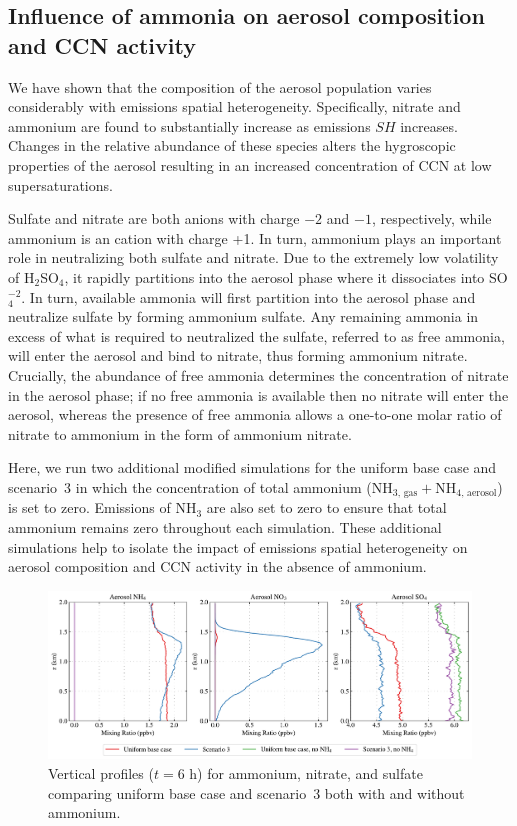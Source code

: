\subsection{Influence of ammonia on aerosol composition and CCN activity}

We have shown that the composition of the aerosol population varies considerably with emissions spatial heterogeneity. Specifically, nitrate and ammonium are found to substantially increase as emissions $SH$ increases. Changes in the relative abundance of these species alters the hygroscopic properties of the aerosol resulting in an increased concentration of CCN at low supersaturations. 

Sulfate and nitrate are both anions with charge $-2$ and $-1$, respectively, while ammonium is an cation with charge +1. In turn, ammonium plays an important role in neutralizing both sulfate and nitrate. Due to the extremely low volatility of H$_2$SO$_4$, it rapidly partitions into the aerosol phase where it dissociates into SO$_4^{-2}$. In turn, available ammonia will first partition into the aerosol phase and neutralize sulfate by forming ammonium sulfate. Any remaining ammonia in excess of what is required to neutralized the sulfate, referred to as free ammonia, will enter the aerosol and bind to nitrate, thus forming ammonium nitrate. Crucially, the abundance of free ammonia determines the concentration of nitrate in the aerosol phase; if no free ammonia is available then no nitrate will enter the aerosol, whereas the presence of free ammonia allows a one-to-one molar ratio of nitrate to ammonium in the form of ammonium nitrate.  

Here, we run two additional modified simulations for the uniform base case and scenario~3 in which the concentration of total ammonium ($\text{NH}_{3\text{, gas}} + \text{NH}_{4\text{, aerosol}}$) is set to zero. Emissions of NH$_3$ are also set to zero to ensure that total ammonium remains zero throughout each simulation. These additional simulations help to isolate the impact of emissions spatial heterogeneity on aerosol composition and CCN activity in the absence of ammonium.  

\begin{figure}[!t]
  \centering
    \includegraphics[width=\textwidth]{figures/chapter5/aerosol-SNA-vertical-profiles-no-nh4-cases-time36.pdf}
    \caption{Vertical profiles ($t=6$ h) for ammonium, nitrate, and sulfate comparing uniform base case and scenario~3 both with and without ammonium.}
    \label{fig:vert-profiles-no-nh4}
\end{figure}

